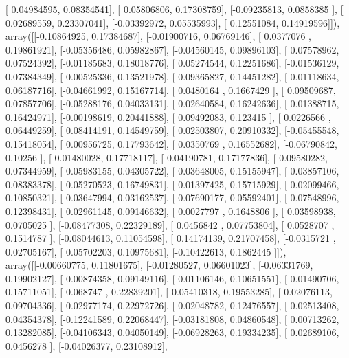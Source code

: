 \documentclass{article}
\begin{document}
       [ 0.04984595,  0.08354541],
       [ 0.05806806,  0.17308759],
       [-0.09235813,  0.0858385 ],
       [ 0.02689559,  0.23307041],
       [-0.03392972,  0.05535993],
       [ 0.12551084,  0.14919596]]), array([[-0.10864925,  0.17384687],
       [-0.01900716,  0.06769146],
       [ 0.0377076 ,  0.19861921],
       [-0.05356486,  0.05982867],
       [-0.04560145,  0.09896103],
       [ 0.07578962,  0.07524392],
       [-0.01185683,  0.18018776],
       [ 0.05274544,  0.12251686],
       [-0.01536129,  0.07384349],
       [-0.00525336,  0.13521978],
       [-0.09365827,  0.14451282],
       [ 0.01118634,  0.06187716],
       [-0.04661992,  0.15167714],
       [ 0.0480164 ,  0.1667429 ],
       [ 0.09509687,  0.07857706],
       [-0.05288176,  0.04033131],
       [ 0.02640584,  0.16242636],
       [ 0.01388715,  0.16424971],
       [-0.00198619,  0.20441888],
       [ 0.09492083,  0.123415  ],
       [ 0.0226566 ,  0.06449259],
       [ 0.08414191,  0.14549759],
       [ 0.02503807,  0.20910332],
       [-0.05455548,  0.15418054],
       [ 0.00956725,  0.17793642],
       [ 0.0350769 ,  0.16552682],
       [-0.06790842,  0.10256   ],
       [-0.01480028,  0.17718117],
       [-0.04190781,  0.17177836],
       [-0.09580282,  0.07344959],
       [ 0.05983155,  0.04305722],
       [-0.03648005,  0.15155947],
       [ 0.03857106,  0.08383378],
       [ 0.05270523,  0.16749831],
       [ 0.01397425,  0.15715929],
       [ 0.02099466,  0.10850321],
       [ 0.03647994,  0.03162537],
       [-0.07690177,  0.05592401],
       [-0.07548996,  0.12398431],
       [ 0.02961145,  0.09146632],
       [ 0.0027797 ,  0.1648806 ],
       [ 0.03598938,  0.0705025 ],
       [-0.08477308,  0.22329189],
       [ 0.0456842 ,  0.07753804],
       [ 0.0528707 ,  0.1514787 ],
       [-0.08044613,  0.11054598],
       [ 0.14174139,  0.21707458],
       [-0.0315721 ,  0.02705167],
       [ 0.05702203,  0.10975681],
       [-0.10422613,  0.1862445 ]]), array([[-0.00660775,  0.11801675],
       [-0.01280527,  0.06601023],
       [-0.06331769,  0.19902127],
       [ 0.00874358,  0.09149116],
       [-0.01106146,  0.10651551],
       [ 0.01490706,  0.15711051],
       [-0.068747  ,  0.22839201],
       [ 0.05410318,  0.19553285],
       [ 0.02076113,  0.09704336],
       [ 0.02977174,  0.22972726],
       [ 0.02048782,  0.12476557],
       [ 0.02513408,  0.04354378],
       [-0.12241589,  0.22068447],
       [-0.03181808,  0.04860548],
       [ 0.00713262,  0.13282085],
       [-0.04106343,  0.04050149],
       [-0.06928263,  0.19334235],
       [ 0.02689106,  0.0456278 ],
       [-0.04026377,  0.23108912],
\end{document}
